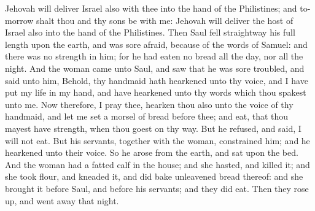 Jehovah will deliver Israel also with thee into the hand of the Philistines; and to-morrow shalt thou and thy sons be with me: Jehovah will deliver the host of Israel also into the hand of the Philistines.  Then Saul fell straightway his full length upon the earth, and was sore afraid, because of the words of Samuel: and there was no strength in him; for he had eaten no bread all the day, nor all the night. And the woman came unto Saul, and saw that he was sore troubled, and said unto him, Behold, thy handmaid hath hearkened unto thy voice, and I have put my life in my hand, and have hearkened unto thy words which thou spakest unto me. Now therefore, I pray thee, hearken thou also unto the voice of thy handmaid, and let me set a morsel of bread before thee; and eat, that thou mayest have strength, when thou goest on thy way. But he refused, and said, I will not eat. But his servants, together with the woman, constrained him; and he hearkened unto their voice. So he arose from the earth, and sat upon the bed. And the woman had a fatted calf in the house; and she hasted, and killed it; and she took flour, and kneaded it, and did bake unleavened bread thereof: and she brought it before Saul, and before his servants; and they did eat. Then they rose up, and went away that night. 

